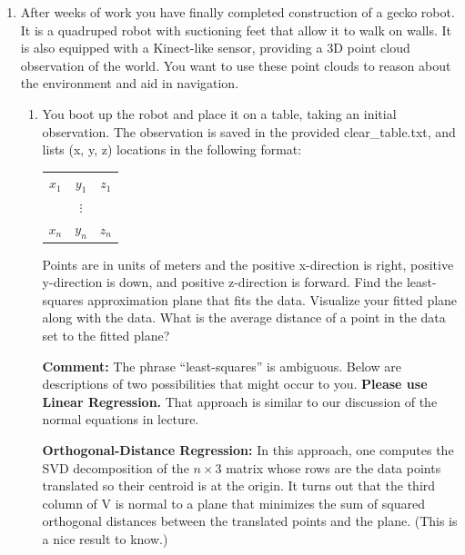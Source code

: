 \documentclass[conference,onecolumn]{IEEEtran}
\begin{document}
\begin{enumerate}[label=\arabic{enumi}.]
            \clearpage
      \item After weeks of work you have finally completed construction of a gecko robot.
            It is a quadruped robot with suctioning feet that allow it to walk on walls.
            It is also equipped with a Kinect-like sensor, providing a 3D point cloud observation of the world.
            You want to use these point clouds to reason about the environment and aid in navigation.
            \begin{enumerate}
                  \item You boot up the robot and place it on a table, taking an initial observation.
                        The observation is saved in the provided clear\_table.txt, and lists (x, y, z) locations in the following format:
                        \begin{table}[H]
                              \centering
                              \begin{tabular}{ccc}
                                    $x_1$ & $y_1$    & $z_1$ \\
                                          & $\vdots$ &       \\
                                    $x_n$ & $y_n$    & $z_n$
                              \end{tabular}
                        \end{table}
                        Points are in units of meters and the positive x-direction is right, positive y-direction is down, and positive z-direction is forward.
                        Find the least-squares approximation plane that fits the data.
                        Visualize your fitted plane along with the data.
                        What is the average distance of a point in the data set to the fitted plane?

                        \textbf{Comment:} The phrase “least-squares” is ambiguous. Below are descriptions of two possibilities that might occur to you.
                        \textbf{Please use Linear Regression.}
                        That approach is similar to our discussion of the normal equations in lecture.

                        \textbf{Orthogonal-Distance Regression:} In this approach, one computes the SVD decomposition of the $n \times 3$ matrix whose rows are the data points translated so their centroid is at the origin.
                        It turns out that the third column of V is normal to a plane that minimizes the sum of squared orthogonal distances between the translated points and the plane.
                        (This is a nice result to know.)


\end{enumerate}
\end{enumerate}
\end{document}
